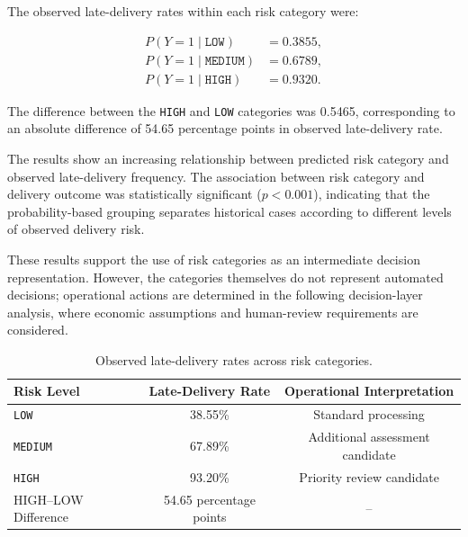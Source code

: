 \documentclass[manuscript, screen, review]{acmart}
\begin{document}
The observed late-delivery rates within each risk category were:

\begin{equation}
\begin{aligned}
P(Y=1\mid \texttt{LOW}) &= 0.3855,\\
P(Y=1\mid \texttt{MEDIUM}) &= 0.6789,\\
P(Y=1\mid \texttt{HIGH}) &= 0.9320.
\end{aligned}
\end{equation}

The difference between the \texttt{HIGH} and \texttt{LOW} categories
was 0.5465, corresponding to an absolute difference of 54.65 percentage
points in observed late-delivery rate.

The results show an increasing relationship between predicted risk
category and observed late-delivery frequency. The association between
risk category and delivery outcome was statistically significant
($p<0.001$), indicating that the probability-based grouping separates
historical cases according to different levels of observed delivery
risk.

These results support the use of risk categories as an intermediate
decision representation. However, the categories themselves do not
represent automated decisions; operational actions are determined in
the following decision-layer analysis, where economic assumptions and
human-review requirements are considered.

\begin{table}[htbp]
\centering
\caption{Observed late-delivery rates across risk categories.}
\label{tab:risk_effectiveness}
\begin{tabular}{lcc}
\hline
Risk Level & Late-Delivery Rate & Operational Interpretation \\
\hline
\texttt{LOW} & 38.55\% & Standard processing \\
\texttt{MEDIUM} & 67.89\% & Additional assessment candidate \\
\texttt{HIGH} & 93.20\% & Priority review candidate \\
\hline
HIGH--LOW Difference & 54.65 percentage points & -- \\
\hline
\end{tabular}
\end{table}
\end{document}

